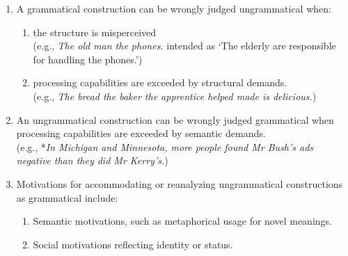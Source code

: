 \begin{enumerate}
\begin{enumerate}
\begin{enumerate}
            \item A divergence is perceived between intended and expected meanings \\(e.g., *\textit{I have 35 years.} intended as `I am 35 years old.')
            \item A contradictory form-meaning pairings occurs in the same utterance \\(e.g., *\textit{I have been there yesterday.})
        \end{enumerate}
        \item A particular form-meaning pair is generally or potentially appropriate but an alternate form is preferred in a specific case, and no compelling reason justifies the deviation. \\(e.g., *\textit{We sheared three sheeps.})
        \item It's exceedingly rare, either because it's coming into or going out of fashion, or because the right conditions for a particular form-meaning pair make . (e.g., syntactic satiation; \cite{Snyder2022})
    \end{enumerate}
    \item A grammatical construction can be wrongly judged ungrammatical when:
    \begin{enumerate}
        \item the structure is misperceived \\(e.g., \textit{The old man the phones.} intended as `The elderly are responsible for handling the phones.')
        \item processing capabilities are exceeded by structural demands. \\(e.g., \textit{The bread the baker the apprentice helped made is delicious.})
    \end{enumerate}
    \item An ungrammatical construction can be wrongly judged grammatical when processing capabilities are exceeded by semantic demands. \\(e.g., *\textit{In Michigan and Minnesota, more people found Mr Bush's ads negative than they did Mr Kerry's.})
    \item Motivations for accommodating or reanalyzing ungrammatical constructions as grammatical include:
    \begin{enumerate}
        \item Semantic motivations, such as metaphorical usage for novel meanings.
        \item Social motivations reflecting identity or status.

\end{enumerate}
\end{enumerate}
